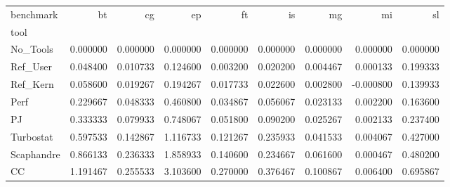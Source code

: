 \begin{tabular}{lrrrrrrrr}
\toprule
benchmark & bt & cg & ep & ft & is & mg & mi & sl \\
tool &  &  &  &  &  &  &  &  \\
\midrule
No_Tools & 0.000000 & 0.000000 & 0.000000 & 0.000000 & 0.000000 & 0.000000 & 0.000000 & 0.000000 \\
Ref_User & 0.048400 & 0.010733 & 0.124600 & 0.003200 & 0.020200 & 0.004467 & 0.000133 & 0.199333 \\
Ref_Kern & 0.058600 & 0.019267 & 0.194267 & 0.017733 & 0.022600 & 0.002800 & -0.000800 & 0.139933 \\
Perf & 0.229667 & 0.048333 & 0.460800 & 0.034867 & 0.056067 & 0.023133 & 0.002200 & 0.163600 \\
PJ & 0.333333 & 0.079933 & 0.748067 & 0.051800 & 0.090200 & 0.025267 & 0.002133 & 0.237400 \\
Turbostat & 0.597533 & 0.142867 & 1.116733 & 0.121267 & 0.235933 & 0.041533 & 0.004067 & 0.427000 \\
Scaphandre & 0.866133 & 0.236333 & 1.858933 & 0.140600 & 0.234667 & 0.061600 & 0.000467 & 0.480200 \\
CC & 1.191467 & 0.255533 & 3.103600 & 0.270000 & 0.376467 & 0.100867 & 0.006400 & 0.695867 \\
\bottomrule
\end{tabular}
